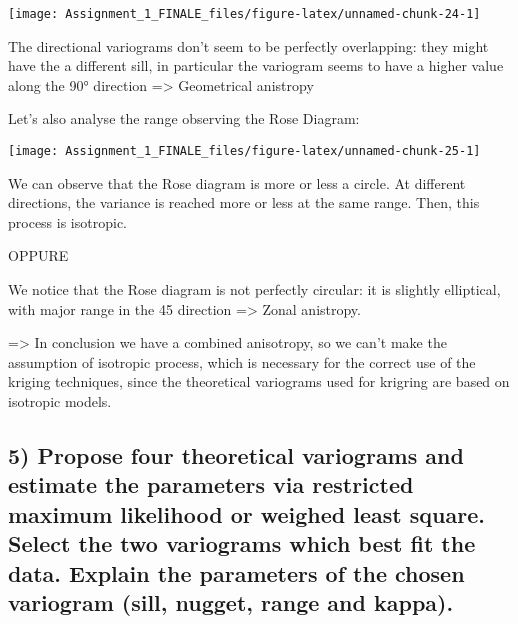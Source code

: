 \documentclass[
]{article}
\begin{document}
\begin{center}\texttt{[image: Assignment\_1\_FINALE\_files/figure-latex/unnamed-chunk-24-1]} \end{center}

The directional variograms don't seem to be perfectly overlapping: they
might have the a different sill, in particular the variogram seems to
have a higher value along the 90° direction =\textgreater{} Geometrical
anistropy

Let's also analyse the range observing the Rose Diagram:

\begin{center}\texttt{[image: Assignment\_1\_FINALE\_files/figure-latex/unnamed-chunk-25-1]} \end{center}

We can observe that the Rose diagram is more or less a circle. At
different directions, the variance is reached more or less at the same
range. Then, this process is isotropic.

OPPURE

We notice that the Rose diagram is not perfectly circular: it is
slightly elliptical, with major range in the 45 direction
=\textgreater{} Zonal anistropy.

=\textgreater{} In conclusion we have a combined anisotropy, so we can't
make the assumption of isotropic process, which is necessary for the
correct use of the kriging techniques, since the theoretical variograms
used for krigring are based on isotropic models.

\newpage

\hypertarget{propose-four-theoretical-variograms-and-estimate-the-parameters-via-restricted-maximum-likelihood-or-weighed-least-square.-select-the-two-variograms-which-best-fit-the-data.-explain-the-parameters-of-the-chosen-variogram-sill-nugget-range-and-kappa.}{%
\subsection{5) Propose four theoretical variograms and estimate the
parameters via restricted maximum likelihood or weighed least square.
Select the two variograms which best fit the data. Explain the
parameters of the chosen variogram (sill, nugget, range and
kappa).}\label{propose-four-theoretical-variograms-and-estimate-the-parameters-via-restricted-maximum-likelihood-or-weighed-least-square.-select-the-two-variograms-which-best-fit-the-data.-explain-the-parameters-of-the-chosen-variogram-sill-nugget-range-and-kappa.}}
\end{document}
